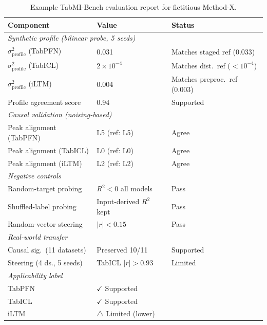 \documentclass{article}
\begin{document}
\begin{table}[htbp]
\centering
\caption{Example TabMI-Bench evaluation report for fictitious Method-X.}
\label{tab:example-report}
\footnotesize
\setlength{\tabcolsep}{4pt}
\begin{tabular}{@{}p{4.8cm} p{3.6cm} p{3.4cm}@{}}
\toprule
Component & Value & Status \\
\midrule
\multicolumn{3}{l}{\textit{Synthetic profile (bilinear probe, 5 seeds)}} \\
\quad $\sigma^2_\text{profile}$ (TabPFN) & 0.031 & Matches staged ref (0.033) \\
\quad $\sigma^2_\text{profile}$ (TabICL) & $2{\times}10^{-4}$ & Matches dist.\ ref ($<10^{-4}$) \\
\quad $\sigma^2_\text{profile}$ (iLTM) & 0.004 & Matches preproc.\ ref (0.003) \\
\quad Profile agreement score & 0.94 & Supported \\
\midrule
\multicolumn{3}{l}{\textit{Causal validation (noising-based)}} \\
\quad Peak alignment (TabPFN) & L5 (ref: L5) & Agree \\
\quad Peak alignment (TabICL) & L0 (ref: L0) & Agree \\
\quad Peak alignment (iLTM) & L2 (ref: L2) & Agree \\
\midrule
\multicolumn{3}{l}{\textit{Negative controls}} \\
\quad Random-target probing & $R^2 < 0$ all models & Pass \\
\quad Shuffled-label probing & Input-derived $R^2$ kept & Pass \\
\quad Random-vector steering & $|r| < 0.15$ & Pass \\
\midrule
\multicolumn{3}{l}{\textit{Real-world transfer}} \\
\quad Causal sig.\ (11 datasets) & Preserved 10/11 & Supported \\
\quad Steering (4 ds., 5 seeds) & TabICL $|r|{>}0.93$ & Limited \\
\midrule
\multicolumn{3}{l}{\textit{Applicability label}} \\
\quad TabPFN & $\checkmark$ Supported & \\
\quad TabICL & $\checkmark$ Supported & \\
\quad iLTM & $\triangle$ Limited (lower) & \\
\bottomrule
\end{tabular}
\end{table}
\end{document}
